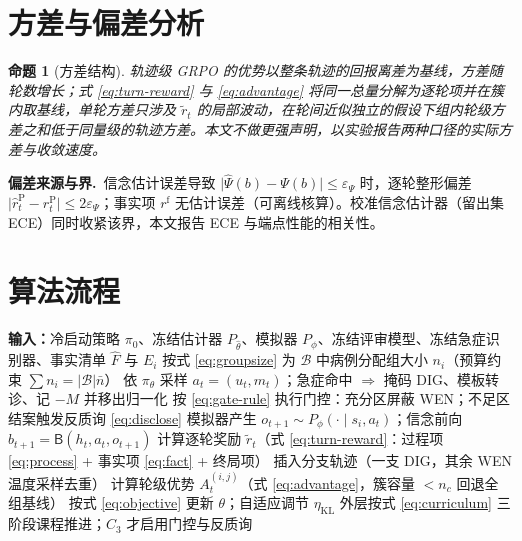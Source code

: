 \documentclass[11pt,a4paper]{ctexart}
\newtheorem{proposition}{命题}
\newcommand{\1}[1]{\mathbb{1}\!\left[#1\right]}
\newcommand{\Fhat}{\hat{F}}
\newcommand{\Bcal}{\mathcal{B}}
\newcommand{\Bupd}{\mathsf{B}}
\newcommand{\VoI}{\mathrm{VoI}}
\begin{document}
\section{方差与偏差分析}

\begin{proposition}[方差结构]\label{prop:variance}
轨迹级 GRPO 的优势以整条轨迹的回报离差为基线，方差随轮数增长；式 \eqref{eq:turn-reward} 与 \eqref{eq:advantage} 将同一总量分解为逐轮项并在簇内取基线，单轮方差只涉及 $\tilde r_t$ 的局部波动，在轮间近似独立的假设下组内轮级方差之和低于同量级的轨迹方差。本文不做更强声明，以实验报告两种口径的实际方差与收敛速度。
\end{proposition}

\textbf{偏差来源与界.}\ 信念估计误差导致 $\lvert\hat\Psi(b)-\Psi(b)\rvert\le\varepsilon_\Psi$ 时，逐轮整形偏差 $\lvert\hat r_t^{\mathrm{P}}-r_t^{\mathrm{P}}\rvert\le2\varepsilon_\Psi$；事实项 $r^{\mathrm{f}}$ 无估计误差（可离线核算）。校准信念估计器（留出集 ECE）同时收紧该界，本文报告 ECE 与端点性能的相关性。

\section{算法流程}
\begin{algorithm}[h]
\caption{BG-GRPO（单个训练迭代）}
\label{alg:bggrpo}
\begin{algorithmic}[1]
\STATE \textbf{输入：}冷启动策略 $\pi_0$、冻结估计器 $P_{\hat\theta}$、模拟器 $P_\phi$、冻结评审模型、冻结急症识别器、事实清单 $\Fhat$ 与 $E_i$
\STATE 按式 \eqref{eq:groupsize} 为 $\Bcal$ 中病例分配组大小 $n_i$（预算约束 $\sum n_i=\lvert\Bcal\rvert\bar n$）
    \STATE 依 $\pi_\theta$ 采样 $a_t=(u_t,m_t)$；急症命中 $\Rightarrow$ 掩码 $\mathrm{DIG}$、模板转诊、记 $-M$ 并移出归一化
    \STATE 按 \eqref{eq:gate-rule} 执行门控：充分区屏蔽 WEN；不足区结案触发反质询 \eqref{eq:disclose}
    \STATE 模拟器产生 $o_{t+1}\sim P_\phi(\cdot\mid s_i,a_t)$；信念前向 $b_{t+1}=\Bupd(h_t,a_t,o_{t+1})$
    \STATE 计算逐轮奖励 $\tilde r_t$（式 \eqref{eq:turn-reward}：过程项 \eqref{eq:process} + 事实项 \eqref{eq:fact} + 终局项）
    \IF{$\VoI(a_t\mid h_t)$ 高（式 \eqref{eq:voi}）或 $H(b_t)>\tau_H$}
      \STATE 插入分支轨迹（一支 DIG，其余 WEN 温度采样去重）
    \ENDIF
  \ENDFOR
\ENDFOR
\STATE 计算轮级优势 $A_t^{(i,j)}$（式 \eqref{eq:advantage}，簇容量 $<n_c$ 回退全组基线）
\STATE 按式 \eqref{eq:objective} 更新 $\theta$；自适应调节 $\eta_{\mathrm{KL}}$
\STATE 外层按式 \eqref{eq:curriculum} 三阶段课程推进；$C_3$ 才启用门控与反质询
\end{algorithmic}
\end{algorithm}
\end{document}
